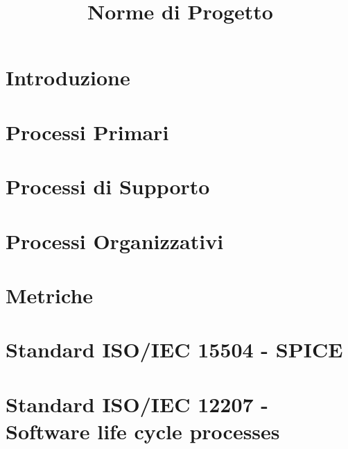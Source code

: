 \documentclass{classes/base}
\title{Norme di Progetto}
\author{\matteo}
\begin{document}
	\maketitle
	\newpage
	
	\newpage
	\tableofcontents
	\newpage
	\listoftables

	\newpage
	\section{Introduzione}
	
	
	\newpage
	\section{Processi Primari}
	
	
	\newpage
	\section{Processi di Supporto}
	
	
	\newpage
	\section{Processi Organizzativi}
	
	
	\newpage
	\section{Metriche}
	
	
	\newpage
	\section{Standard ISO/IEC 15504 - SPICE}
	
	
	\newpage
	\section{Standard ISO/IEC 12207 - Software life cycle processes}
	
	
\end{document}
